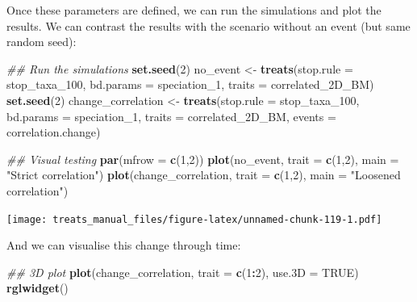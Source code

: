 \documentclass[
]{book}
\newenvironment{Shaded}{\begin{snugshade}}{\end{snugshade}}
\newcommand{\CommentTok}[1]{\textcolor[rgb]{0.56,0.35,0.01}{\textit{#1}}}
\newcommand{\DataTypeTok}[1]{\textcolor[rgb]{0.13,0.29,0.53}{#1}}
\newcommand{\DecValTok}[1]{\textcolor[rgb]{0.00,0.00,0.81}{#1}}
\newcommand{\KeywordTok}[1]{\textcolor[rgb]{0.13,0.29,0.53}{\textbf{#1}}}
\newcommand{\NormalTok}[1]{#1}
\newcommand{\OperatorTok}[1]{\textcolor[rgb]{0.81,0.36,0.00}{\textbf{#1}}}
\newcommand{\OtherTok}[1]{\textcolor[rgb]{0.56,0.35,0.01}{#1}}
\newcommand{\StringTok}[1]{\textcolor[rgb]{0.31,0.60,0.02}{#1}}
\begin{document}
Once these parameters are defined, we can run the simulations and plot the results.
We can contrast the results with the scenario without an event (but same random seed):

\begin{Shaded}
\begin{Highlighting}[]
\CommentTok{\#\# Run the simulations}
\KeywordTok{set.seed}\NormalTok{(}\DecValTok{2}\NormalTok{)}
\NormalTok{no\_event \textless{}{-}}\StringTok{ }\KeywordTok{treats}\NormalTok{(}\DataTypeTok{stop.rule =}\NormalTok{ stop\_taxa\_}\DecValTok{100}\NormalTok{,}
                 \DataTypeTok{bd.params =}\NormalTok{ speciation\_}\DecValTok{1}\NormalTok{,}
                 \DataTypeTok{traits    =}\NormalTok{ correlated\_2D\_BM)}
\KeywordTok{set.seed}\NormalTok{(}\DecValTok{2}\NormalTok{)}
\NormalTok{change\_correlation \textless{}{-}}\StringTok{ }\KeywordTok{treats}\NormalTok{(}\DataTypeTok{stop.rule =}\NormalTok{ stop\_taxa\_}\DecValTok{100}\NormalTok{,}
                           \DataTypeTok{bd.params =}\NormalTok{ speciation\_}\DecValTok{1}\NormalTok{,}
                           \DataTypeTok{traits    =}\NormalTok{ correlated\_2D\_BM,}
                           \DataTypeTok{events    =}\NormalTok{ correlation.change)}

\CommentTok{\#\# Visual testing}
\KeywordTok{par}\NormalTok{(}\DataTypeTok{mfrow =} \KeywordTok{c}\NormalTok{(}\DecValTok{1}\NormalTok{,}\DecValTok{2}\NormalTok{))}
\KeywordTok{plot}\NormalTok{(no\_event, }\DataTypeTok{trait =} \KeywordTok{c}\NormalTok{(}\DecValTok{1}\NormalTok{,}\DecValTok{2}\NormalTok{), }\DataTypeTok{main =} \StringTok{"Strict correlation"}\NormalTok{)}
\KeywordTok{plot}\NormalTok{(change\_correlation, }\DataTypeTok{trait =} \KeywordTok{c}\NormalTok{(}\DecValTok{1}\NormalTok{,}\DecValTok{2}\NormalTok{), }\DataTypeTok{main =} \StringTok{"Loosened correlation"}\NormalTok{)}
\end{Highlighting}
\end{Shaded}

\texttt{[image: treats\_manual\_files/figure-latex/unnamed-chunk-119-1.pdf]}

And we can visualise this change through time:

\begin{Shaded}
\begin{Highlighting}[]
\CommentTok{\#\# 3D plot}
\KeywordTok{plot}\NormalTok{(change\_correlation, }\DataTypeTok{trait =} \KeywordTok{c}\NormalTok{(}\DecValTok{1}\OperatorTok{:}\DecValTok{2}\NormalTok{), }\DataTypeTok{use.3D =} \OtherTok{TRUE}\NormalTok{)}
\KeywordTok{rglwidget}\NormalTok{()}
\end{Highlighting}
\end{Shaded}
\end{document}
